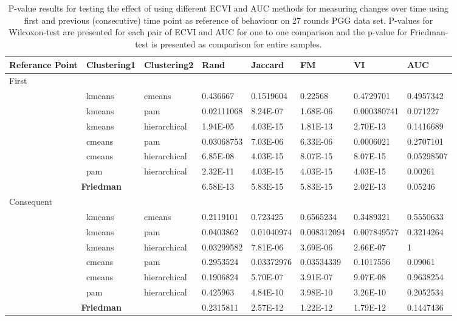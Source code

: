 \begin{landscape}
\begin{table}[H]
\centering
\caption{P-value results for testing the effect of using different ECVI and AUC methods for measuring changes over time using first and previous (consecutive) time point as reference of behaviour on 27 rounds PGG data set. P-values for Wilcoxon-test are presented for each pair of ECVI and AUC for one to one comparison and the p-value for Friedman-test is presented as comparison for entire samples.}
\label{tab:Pvalue27PGGECVIDiff}
	\begin{tabular}{llllllll}\toprule
		Referance Point & Clustering1 & Clustering2  & Rand        & Jaccard     & FM          & VI          & AUC        \\\midrule
		First\\ 
		& kmeans      & cmeans       & 0.436667   & 0.1519604  & 0.22568     & 0.4729701   & 0.4957342  \\
		& kmeans      & pam          & 0.02111068 & 8.24E-07   & 1.68E-06    & 0.000380741 & 0.071227   \\
		& kmeans      & hierarchical & 1.94E-05   & 4.03E-15   & 1.81E-13    & 2.70E-13    & 0.1416689  \\
		& cmeans      & pam          & 0.03068753 & 7.03E-06   & 6.33E-06    & 0.0006021   & 0.2707101  \\
		& cmeans      & hierarchical & 6.85E-08   & 4.03E-15   & 8.07E-15    & 8.07E-15    & 0.05298507 \\
		& pam         & hierarchical & 2.32E-11   & 4.03E-15   & 4.03E-15    & 4.03E-15    & 0.00261    \\
		\multicolumn{3}{c}{\textbf{Friedman}}     & 6.58E-13   & 5.83E-15   & 5.83E-15    & 2.02E-13    & 0.05246    \\
		Consequent  \\		
		& kmeans      & cmeans       & 0.2119101  & 0.723425   & 0.6565234   & 0.3489321   & 0.5550633  \\
		& kmeans      & pam          & 0.0403862  & 0.01040974 & 0.008312094 & 0.007849577 & 0.3214264  \\
		& kmeans      & hierarchical & 0.03299582 & 7.81E-06   & 3.69E-06    & 2.66E-07    & 1          \\
		& cmeans      & pam          & 0.2953524  & 0.03372976 & 0.03534339  & 0.1017556   & 0.09061    \\
		& cmeans      & hierarchical & 0.1906824  & 5.70E-07   & 3.91E-07    & 9.07E-08    & 0.9638254  \\
		& pam         & hierarchical & 0.425963   & 4.84E-10   & 3.98E-10    & 3.26E-10    & 0.2052534  \\
		\multicolumn{3}{c}{\textbf{Friedman}}     & 0.2315811  & 2.57E-12   & 1.22E-12    & 1.79E-12    & 0.1447436 \\
		\bottomrule
	\end{tabular} 
\end{table}

\end{landscape}